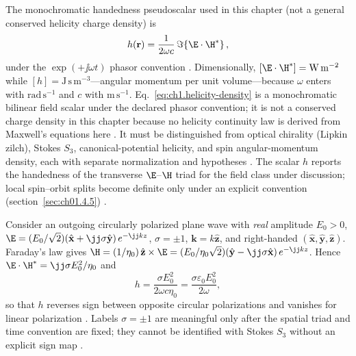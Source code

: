The monochromatic handedness pseudoscalar used in this chapter (not a general conserved helicity charge density) is
\begin{equation}
\label{eq:ch1.helicity-density}
h(\mathbf{r})=
\frac{1}{2\omega c}\,
\Im\!\left\{\E\cdot\H^*\right\},
\end{equation}
under the $\exp(+\jj\omega t)$ phasor convention \cite{stratton1941,belinfante1940,tai1994}.
Dimensionally, $[\E\cdot\H^*]=\mathrm{W\,m^{-2}}$ while $[h]=\mathrm{J\,s\,m^{-3}}$---angular momentum per unit volume---because $\omega$ enters with $\mathrm{rad\,s^{-1}}$ and $c$ with $\mathrm{m\,s^{-1}}$.
Eq.~\eqref{eq:ch1.helicity-density} is a monochromatic bilinear field scalar under the declared phasor convention; it is not a conserved charge density in this chapter because no helicity continuity law is derived from Maxwell's equations here \cite{stratton1941,belinfante1940}. It must be distinguished from optical chirality (Lipkin zilch), Stokes $S_3$, canonical-potential helicity, and spin angular-momentum density, each with separate normalization and hypotheses \cite{stratton1941,tai1994}. The scalar $h$ reports the handedness of the transverse $\E$--$\H$ triad for the field class under discussion; local spin--orbit splits become definite only under an explicit convention (section~\ref{sec:ch01.4.5}) \cite{belinfante1940,stratton1941}.

Consider an outgoing circularly polarized plane wave with \emph{real} amplitude $E_0>0$,
$\E=(E_0/\sqrt{2})(\hat{\mathbf{x}}+\jj\sigma\hat{\mathbf{y}})\,e^{-\jj kz}$, $\sigma=\pm1$, $\mathbf{k}=k\hat{\mathbf{z}}$, and right-handed $(\hat{\mathbf{x}},\hat{\mathbf{y}},\hat{\mathbf{z}})$. Faraday's law gives
$\H=(1/\eta_0)\,\hat{\mathbf{z}}\times\E=(E_0/\eta_0\sqrt{2})(\hat{\mathbf{y}}-\jj\sigma\hat{\mathbf{x}})\,e^{-\jj kz}$.
Hence $\E\cdot\H^*=\jj\sigma E_0^2/\eta_0$ and
\begin{equation}
\label{eq:ch1.helicity-plane-wave}
h=\frac{\sigma E_0^2}{2\omega c\eta_0}
=\frac{\sigma\varepsilon_0 E_0^2}{2\omega},
\end{equation}
so that $h$ reverses sign between opposite circular polarizations and vanishes for linear polarization \cite{stratton1941,belinfante1940}. Labels $\sigma=\pm1$ are meaningful only after the spatial triad and time convention are fixed; they cannot be identified with Stokes $S_3$ without an explicit sign map \cite{stratton1941}.

